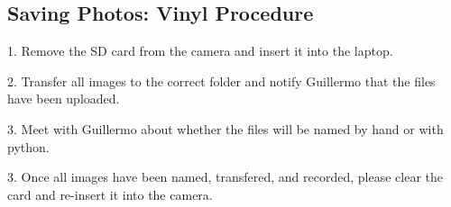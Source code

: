 \newpage


\subsection{Saving Photos: Vinyl Procedure}

1. Remove the SD card from the camera and insert it into the laptop.

2. Transfer all images to the correct folder and notify Guillermo that the files have been uploaded. 

3. Meet with Guillermo about whether the files will be named by hand or with python. 

3. Once all images have been named, transfered, and recorded, please clear the card and re-insert  it into the camera. 


